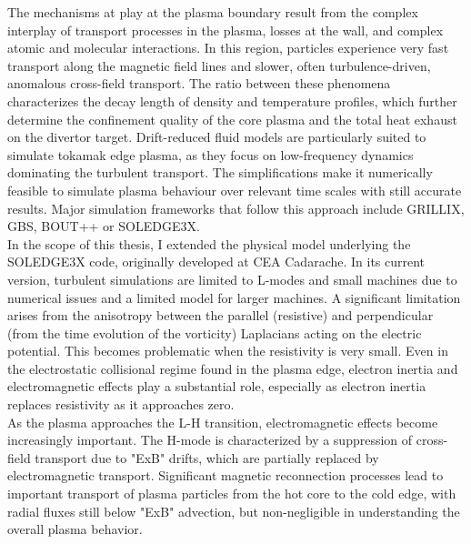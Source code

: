 The mechanisms at play at the plasma boundary result from the complex interplay of transport processes in the plasma, losses at the wall, and complex atomic and molecular interactions. In this region, particles experience very fast transport along the magnetic field lines and slower, often turbulence-driven, anomalous cross-field transport\cite{loarte2007}. The ratio between these phenomena characterizes the decay length of density and temperature profiles, which further determine the confinement quality of the core plasma and the total heat exhaust on the divertor target. Drift-reduced fluid models are particularly suited to simulate tokamak edge plasma, as they focus on low-frequency dynamics dominating the turbulent transport. The simplifications make it numerically feasible to simulate plasma behaviour over relevant time scales with still accurate results. Major simulation frameworks that follow this approach include GRILLIX\cite{GrillixGeneralPaper,stegmeir2019}, GBS\cite{Ricci_2012,giacomin2022gbs}, BOUT++\cite{DUDSON_2009,dudson2015} or SOLEDGE3X\cite{tamain2016tokam3x,Bufferand_2021}. \\

In the scope of this thesis, I extended the physical model underlying the SOLEDGE3X code, originally developed at CEA Cadarache. In its current version, turbulent simulations are limited to L-modes and small machines due to numerical issues and a limited model for larger machines. A significant limitation arises from the anisotropy between the parallel (resistive) and perpendicular (from the time evolution of the vorticity) Laplacians acting on the electric potential. This becomes problematic when the resistivity is very small. Even in the electrostatic collisional regime found in the plasma edge, electron inertia and electromagnetic effects play a substantial role, especially as electron inertia replaces resistivity as it approaches zero. \\

As the plasma approaches the L-H transition, electromagnetic effects become increasingly important. The H-mode is characterized by a suppression of cross-field transport due to "ExB" drifts, which are partially replaced by electromagnetic transport. Significant magnetic reconnection processes lead to important transport of plasma particles from the hot core to the cold edge, with radial fluxes still below "ExB" advection, but non-negligible in understanding the overall plasma behavior. \\

